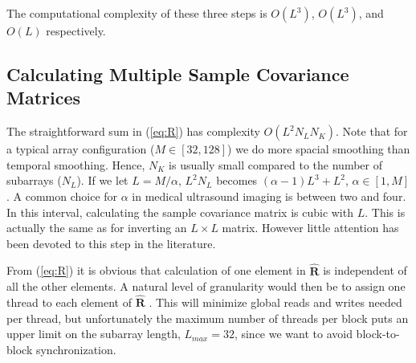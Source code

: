 \documentclass[conference]{IEEEtran}
\newcommand{\mat}[1]{\mathbf{#1}}
\begin{document}
The computational complexity of these three steps is $O(L^3)$, $O(L^3)$, and $O(L)$ respectively.

\subsection{Calculating Multiple Sample Covariance Matrices}
The straightforward sum in (\ref{eq:R}) has complexity $O(L^2N_LN_K)$. Note that for a typical array configuration ($M \in [32, 128]$) we do more spacial smoothing than temporal smoothing. Hence, $N_K$ is usually small compared to the number of subarrays ($N_L$). If we let $L = M/\alpha$, $L^2N_L$ becomes $(\alpha - 1)L^3 + L^2$, $\alpha \in [1, M]$. A common choice for $\alpha$ in medical ultrasound imaging is between two and four. In this interval, calculating the sample covariance matrix is cubic with $L$. This is actually the same as for inverting an $L \times L$ matrix. However little attention has been devoted to this step in the literature.

From (\ref{eq:R}) it is obvious that calculation of one element in $\mat{\hat{R}}$ is independent of all the other elements. A natural level of granularity would then be to assign one thread to each element of $\mat{\hat{R}}$ \cite{Chen2011}. This will minimize global reads and writes needed per thread, but unfortunately the maximum number of threads per block puts an upper limit on the subarray length, $L_{max}=32$, since we want to avoid block-to-block synchronization.
\end{document}
